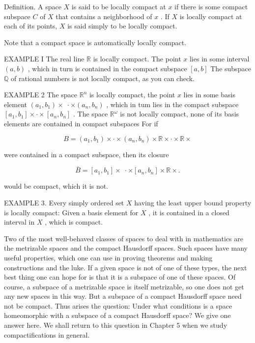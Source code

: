 \documentclass[10pt]{article}
\begin{document}
Definition. A space \(X\) is said to be locally compact at \(x\) if there is some compact subspace \(C\) of \(X\) that contains a neighborhood of \(x\) . If \(X\) is locally compact at each of its points, \(X\) is said simply to be locally compact.

Note that a compact space is automatically locally compact.

EXAMPLE I The real line \(\mathbb{R}\) is locally compact. The point \(x\) lies in some interval \(\left( {a,b}\right)\) , which in turn is contained in the compact subspace \(\left\lbrack  {a,b}\right\rbrack\) The subspace \(\mathbb{Q}\) of rational numbers is not locally compact, as you can check.

EXAMPLE 2 The space \({\mathbb{R}}^{n}\) is locally compact, the point \(x\) lies in some basis element \(\left( {{a}_{1},{b}_{1}}\right)  \times  \; \cdot   \times  \left( {{a}_{n},{b}_{n}}\right)\) , which in tum lies in the compact subspace \(\left\lbrack  {{a}_{1},{b}_{1}}\right\rbrack   \times   \cdot   \times  \left\lbrack  {{a}_{n},{b}_{n}}\right\rbrack\) . The space \({\mathbb{R}}^{\omega }\) is not locally compact, none of its basis elements are contained in compact subspaces For if

\[
B = \left( {{a}_{1},{b}_{1}}\right)  \times   \cdot   \times  \left( {{a}_{n},{b}_{n}}\right)  \times  \mathbb{R} \times   \cdot   \times  \mathbb{R} \times
\]

were contained in a compact subspace, then its closure

\[
\bar{B} = \left\lbrack  {{a}_{1},{b}_{1}}\right\rbrack   \times  \; \cdot   \times  \left\lbrack  {{a}_{n},{b}_{n}}\right\rbrack   \times  \mathbb{R} \times  .
\]

would be compact, which it is not.

EXAMPLE 3. Every simply ordered set \(X\) having the least upper bound property is locally compact: Given a basis element for \(X\) , it is contained in a closed interval in \(X\) , which is compact.

Two of the most well-behaved classes of spaces to deal with in mathematics are the metrizable spaces and the compact Hausdorff spaces. Such spaces have many useful properties, which one can use in proving theorems and making constructions and the luke. If a given space is not of one of these types, the next best thing one can hope for is that it is a subspace of one of these spaces. Of course, a subspace of a metrizable space is itself metrizable, so one does not get any new spaces in this way. But a subspace of a compact Hausdorff space need not be compact. Thus arises the question: Under what conditions is a space homeomorphic with a subspace of a compact Hausdorff space? We give one answer here. We shall return to this question in Chapter 5 when we study compactifications in general.
\end{document}
